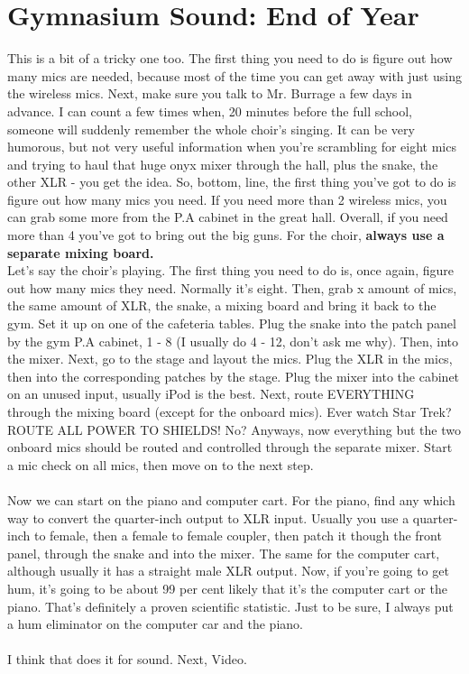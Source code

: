 \documentclass[11pt,a4paper]{book}
\begin{document}
\section{Gymnasium Sound: End of Year}
This is a bit of a tricky one too. The first thing you need to do is figure out how many mics are needed, because most of the time you can get away with just using the wireless mics. Next, make sure you talk to Mr. Burrage a few days in advance. I can count a few times when, 20 minutes before the full school, someone will suddenly remember the whole choir's singing. It can be very humorous, but not very useful information when you're scrambling for eight mics and trying to haul that huge onyx mixer through the hall, plus the snake, the other XLR - you get the idea. So, bottom, line, the first thing you've got to do is figure out how many mics you need. If you need more than 2 wireless mics, you can grab some more from the P.A cabinet in the great hall. Overall, if you need more than 4 you've got to bring out the big guns. For the choir, \textbf{always use a separate mixing board.}
\\
Let's say the choir's playing. The first thing you need to do is, once again, figure out how many mics they need. Normally it's eight. Then, grab x amount of mics, the same amount of XLR, the snake, a mixing board and bring it back to the gym. Set it up on one of the cafeteria tables. Plug the snake into the patch panel by the gym P.A cabinet, 1 - 8 (I usually do 4 - 12, don't ask me why). Then, into the mixer. Next, go to the stage and layout the mics. Plug the XLR in the mics, then into the corresponding patches by the stage. Plug the mixer into the cabinet on an unused input, usually iPod is the best. Next, route EVERYTHING through the mixing board (except for the onboard mics). Ever watch Star Trek? ROUTE ALL POWER TO SHIELDS! No? Anyways, now everything but the two onboard mics should be routed and controlled through the separate mixer. Start a mic check on all mics, then move on to the next step.
\\
\\
Now we can start on the piano and computer cart. For the piano, find any which way to convert the quarter-inch output to XLR input. Usually you use a quarter-inch to female, then a female to female coupler, then patch it though the front panel, through the snake and into the mixer. The same for the computer cart, although usually it has a straight male XLR output. Now, if you're going to get hum, it's going to be about 99 per cent likely that it's the computer cart or the piano. That's definitely a proven scientific statistic. Just to be sure, I always put a hum eliminator on the computer car and the piano.
\\
\\
I think that does it for sound. Next, Video.
\end{document}
